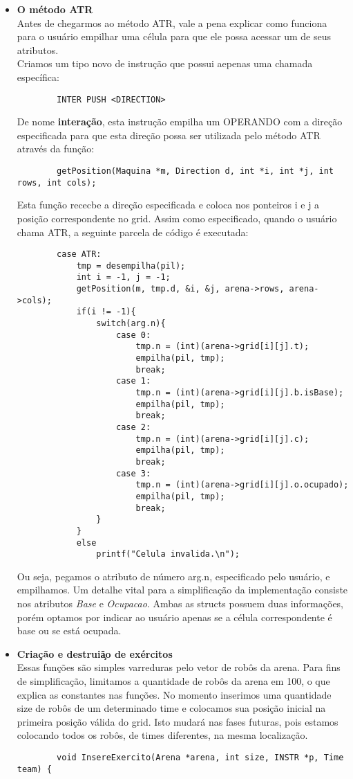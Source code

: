 \documentclass{article}
\begin{document}
\begin{itemize}
    \item \textbf{O m\'etodo ATR} \\
    Antes de chegarmos ao m\'etodo ATR, vale a pena explicar como funciona para o usu\'ario empilhar uma c\'elula para que ele possa acessar um de seus atributos. \\
    Criamos um tipo novo de instru\c c\~ao que possui aepenas uma chamada espec\'ifica:
    \begin{lstlisting}
        INTER PUSH <DIRECTION>
    \end{lstlisting}
    De nome \textbf{intera\c c\~ao}, esta instru\c c\~ao empilha um OPERANDO com a dire\c c\~ao especificada para que esta dire\c c\~ao possa ser utilizada pelo m\'etodo ATR atrav\'es da fun\c c\~ao:
    \begin{lstlisting}
        getPosition(Maquina *m, Direction d, int *i, int *j, int rows, int cols);
    \end{lstlisting}
    Esta fun\c c\~ao rececbe a dire\c c\~ao especificada e coloca nos ponteiros i e j a posi\c c\~ao correspondente no grid.
    Assim como especificado, quando o usu\'ario chama ATR, a seguinte parcela de c\'odigo \'e executada:
    \begin{lstlisting}
        case ATR:
			tmp = desempilha(pil);
			int i = -1, j = -1;
			getPosition(m, tmp.d, &i, &j, arena->rows, arena->cols);
			if(i != -1){
				switch(arg.n){
				    case 0:
						tmp.n = (int)(arena->grid[i][j].t);
						empilha(pil, tmp);
						break;
					case 1:
						tmp.n = (int)(arena->grid[i][j].b.isBase);
						empilha(pil, tmp);
						break;
					case 2:
				    	tmp.n = (int)(arena->grid[i][j].c);
						empilha(pil, tmp);
						break;
					case 3:
						tmp.n = (int)(arena->grid[i][j].o.ocupado);
						empilha(pil, tmp);
						break;
				}
			}
			else
				printf("Celula invalida.\n");
    \end{lstlisting}
    Ou seja, pegamos o atributo de n\'umero arg.n, especificado pelo usu\'ario, e empilhamos. Um detalhe vital para a simplifica\c c\~ao da implementa\c c\~ao consiste nos atributos \textit{Base} e \textit{Ocupacao}. Ambas as structs possuem duas informa\c c\~oes, por\'em optamos por indicar ao usu\'ario apenas se a c\'elula correspondente \'e base ou se est\'a ocupada.\\
    
    \item \textbf{Cria\c c\~ao e destrui\c \~ao de ex\'ercitos} \\
    Essas fun\c c\~oes s\~ao simples varreduras pelo vetor de rob\^os da arena. Para fins de simplifica\c c\~ao, limitamos a quantidade de rob\^os da arena em 100, o que explica as constantes nas fun\c c\~oes. No momento inserimos uma quantidade size de rob\^os de um determinado time e colocamos sua posi\c c\~ao inicial na primeira posi\c c\~ao v\'alida do grid. Isto mudar\'a nas fases futuras, pois estamos colocando todos os rob\^os, de times diferentes, na mesma localiza\c c\~ao.
    \begin{lstlisting}
        void InsereExercito(Arena *arena, int size, INSTR *p, Time team) {


\end{lstlisting}
\end{itemize}
\end{document}
